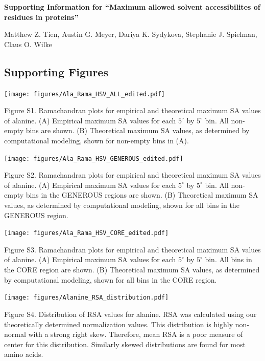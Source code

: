 \documentclass[12pt]{article}
\begin{document}
\begin{center}
\large\textbf{Supporting Information for ``Maximum allowed solvent accessibilites of residues in proteins''}\\
\end{center}

\bigskip
\noindent Matthew Z. Tien, Austin G. Meyer, Dariya K. Sydykova, Stephanie J. Spielman, Claus O. Wilke

\bigskip

\subsection*{Supporting Figures}
\centerline{\texttt{[image: figures/Ala\_Rama\_HSV\_ALL\_edited.pdf]}}

\noindent Figure S1. Ramachandran plots for empirical and theoretical maximum SA values of alanine. (A) Empirical maximum SA values for each $5^\circ$ by $5^\circ$ bin. All non-empty bins are shown. (B) Theoretical maximum SA values, as determined by computational modeling, shown for non-empty bins in (A).

\vspace*{.5in}

\centerline{\texttt{[image: figures/Ala\_Rama\_HSV\_GENEROUS\_edited.pdf]}}

\noindent Figure S2. Ramachandran plots for empirical and theoretical maximum SA values of alanine. (A) Empirical maximum SA values for each $5^\circ$ by $5^\circ$ bin. All non-empty bins in the GENEROUS regions are shown. (B) Theoretical maximum SA values, as determined by computational modeling, shown for all bins in the GENEROUS region.

\newpage

\centerline{\texttt{[image: figures/Ala\_Rama\_HSV\_CORE\_edited.pdf]}}

\noindent Figure S3. Ramachandran plots for empirical and theoretical maximum SA values of alanine. (A) Empirical maximum SA values for each $5^\circ$ by $5^\circ$ bin. All bins in the CORE region are shown. (B) Theoretical maximum SA values, as determined by computational modeling, shown for all bins in the CORE region.


\vspace*{.5in}

\centerline{\texttt{[image: figures/Alanine\_RSA\_distribution.pdf]}}

\noindent Figure S4. Distribution of RSA values for alanine. RSA was calculated using our theoretically determined normalization values. This distribution is highly non-normal with a strong right skew. Therefore, mean RSA is a poor measure of center for this distribution. Similarly skewed distributions are found for most amino acids.
\end{document}
